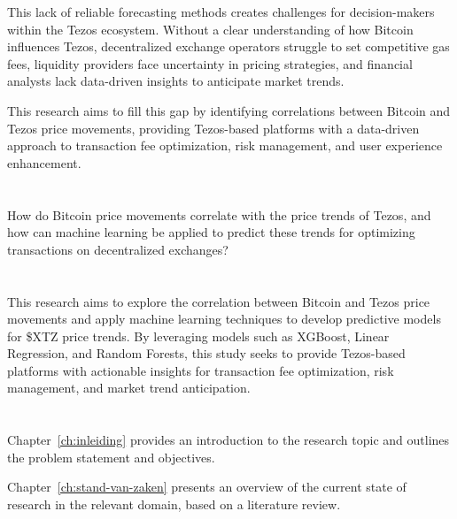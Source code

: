 This lack of reliable forecasting methods creates challenges for decision-makers within the Tezos ecosystem. Without a clear understanding of how Bitcoin influences Tezos, decentralized exchange operators struggle to set competitive gas fees, liquidity providers face uncertainty in pricing strategies, and financial analysts lack data-driven insights to anticipate market trends.

This research aims to fill this gap by identifying correlations between Bitcoin and Tezos price movements, providing Tezos-based platforms with a data-driven approach to transaction fee optimization, risk management, and user experience enhancement.

\section{}%
\label{sec:onderzoeksvraag}

How do Bitcoin price movements correlate with the price trends of Tezos, and how can machine learning be applied to predict these trends for optimizing transactions on decentralized exchanges?

\section{}%
\label{sec:onderzoeksdoelstelling}

This research aims to explore the correlation between Bitcoin and Tezos price movements and apply machine learning techniques to develop predictive models for \$XTZ price trends. By leveraging models such as XGBoost, Linear Regression, and Random Forests, this study seeks to provide Tezos-based platforms with actionable insights for transaction fee optimization, risk management, and market trend anticipation.

\section{}%
\label{sec:opzet-bachelorproef}

Chapter~\ref{ch:inleiding} provides an introduction to the research topic and outlines the problem statement and objectives.

Chapter~\ref{ch:stand-van-zaken} presents an overview of the current state of research in the relevant domain, based on a literature review.

